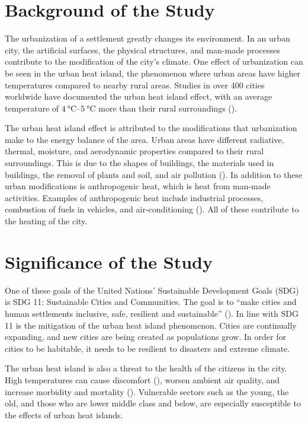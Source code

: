 \section{Background of the Study}
	The urbanization of a settlement greatly changes its environment.
	In an urban city, the artificial surfaces, the physical structures, and man-made processes contribute to the modification of the city's climate.
	One effect of urbanization can be seen in the urban heat island, the phenomenon where urban areas have higher temperatures compared to nearby rural areas.
	Studies in over 400 cities worldwide have documented the urban heat island effect,
		with an average temperature of $\qtyrange{4}{5}{\degreeCelsius}$ more than their rural surroundings (\cite{Santamouris2020}).
	
	The urban heat island effect is attributed to the modifications that urbanization make to the energy balance of the area.
	Urban areas have different radiative, thermal, moisture, and aerodynamic properties compared to their rural surroundings.
	This is due to the shapes of buildings, the materials used in buildings, the removal of plants and soil, and air pollution (\cite{Stewart2012}).
	In addition to these urban modifications is anthropogenic heat, which is heat from man-made activities.
	Examples of anthropogenic heat include industrial processes, combustion of fuels in vehicles, and air-conditioning (\cite{Oke2017urban}).
	All of these contribute to the heating of the city.
	
\section{Significance of the Study}
	One of these goals of the United Nations' Sustainable Development Goals (SDG) is SDG 11: Sustainable Cities and Communities.
	The goal is to ``make cities and human settlements inclusive, safe, resilient and sustainable'' (\cite{UN2015}).
	In line with SDG 11 is the mitigation of the urban heat island phenomenon.
	Cities are continually expanding, and new cities are being created as populations grow.
	In order for cities to be habitable, it needs to be resilient to disasters and extreme climate.	

	The urban heat island is also a threat to the health of the citizens in the city.
	High temperatures can cause discomfort (\cite{Bhati2018}), worsen ambient air quality, and increase morbidity and mortality (\cite {Khan2021}).
	Vulnerable sectors such as the young, the old, and those who are lower middle class and below,
		are especially susceptible to the effects of urban heat islands.
	
